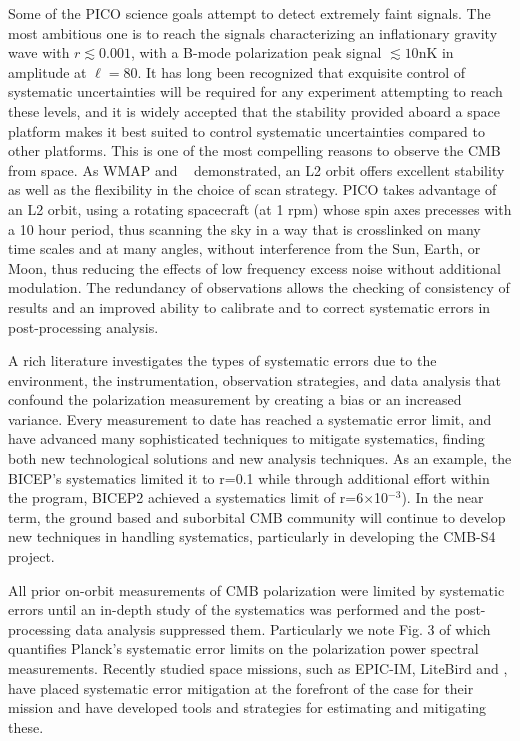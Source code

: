\documentclass[PICOReport.tex]{subfiles}
\begin{document}
Some of the PICO science goals attempt to detect extremely faint signals. The most ambitious one is to reach the  
signals characterizing an inflationary gravity wave with $r\lesssim0.001$, with a B-mode polarization peak signal $\lesssim10$nK in amplitude at $\ell=80$.
It has long been recognized that exquisite control of systematic uncertainties will be required for any experiment attempting 
to reach these levels, and it is widely accepted that the stability provided aboard a space platform makes it best suited to
control systematic uncertainties compared to other platforms. This is one of the most compelling reasons to observe the 
CMB from space.  As WMAP and \planck~ demonstrated, an L2 orbit offers excellent stability as well 
as the flexibility in the choice of scan strategy.  
PICO takes advantage of an L2 orbit, using a rotating spacecraft (at 1 rpm) whose spin axes precesses with a 10 hour period, thus scanning the sky in a way that is crosslinked on many time scales and at many angles, without interference from the Sun, Earth, or Moon, thus reducing the effects of low frequency excess noise without additional modulation. 
The redundancy of observations allows the checking of consistency of results and an improved ability to calibrate and to correct systematic errors in post-processing analysis.

A rich literature investigates the types of systematic errors due to the environment, the instrumentation, observation strategies, and data analysis that confound the polarization measurement by creating a bias or an increased variance\cite{hu03,shimon2008,yadav2010}. 
Every measurement to date has  reached a systematic error limit, and have advanced many sophisticated techniques to mitigate systematics, finding both new technological solutions and new analysis techniques.
As an example, the BICEP's systematics limited it to r=0.1\cite{Takahashi2010} while through additional effort within the program, BICEP2 achieved a systematics limit of r=6$\times$10$^{-3}$\cite{BICEP2_III}).
In the near term, the ground based and suborbital CMB community will continue to develop new techniques in handling systematics, particularly in developing the CMB-S4 project.

All prior on-orbit measurements of CMB polarization were limited by systematic errors until an in-depth study of the systematics was performed and the post-processing data analysis suppressed them\cite{Bennett13,planck2016_xlvi,Planck2018_I}. 
Particularly we note Fig. 3 of \cite{Planck2018_I} which quantifies Planck's systematic error limits on the polarization power spectral measurements.
Recently studied space missions, such as EPIC-IM, LiteBird and  \core, have placed
systematic error mitigation at the forefront of the case for their
mission and have developed tools and strategies for estimating and mitigating these\cite{hazumi2012,wallis2017,Natoli2018}.
\end{document}

